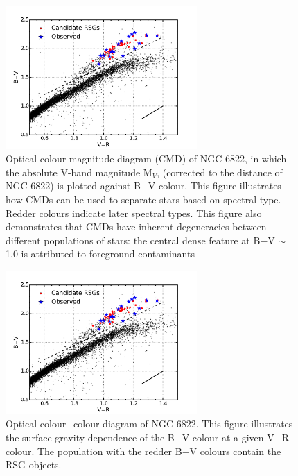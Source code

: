  \begin{figure}
 \centering
 \includegraphics[width=0.65\textwidth]{intro/N6822_bvr}
 \caption[B$-$V, V]{Optical colour-magnitude diagram (CMD) of NGC 6822, in which the absolute V-band magnitude M$_{V}$, (corrected to the distance of NGC 6822) is plotted against B$-$V colour.
This figure illustrates how CMDs can be used to separate stars based on spectral type. Redder colours indicate later spectral types.
This figure also demonstrates that CMDs have inherent degeneracies  between different populations of stars: the central dense feature at B$-$V $\sim$ 1.0 is attributed to foreground contaminants
 \label{fig:CMD}}
\end{figure}

 \begin{figure}
 \centering
 \includegraphics[width=0.65\textwidth]{intro/N6822_bvr}
 \caption[B$-$V, V$-$R]{Optical colour$-$colour diagram of NGC 6822. This figure illustrates the surface gravity dependence of the B$-$V colour at a given V$-$R colour. The population with the redder B$-$V colours contain the RSG objects.
 \label{fig:CCD}}
\end{figure}


